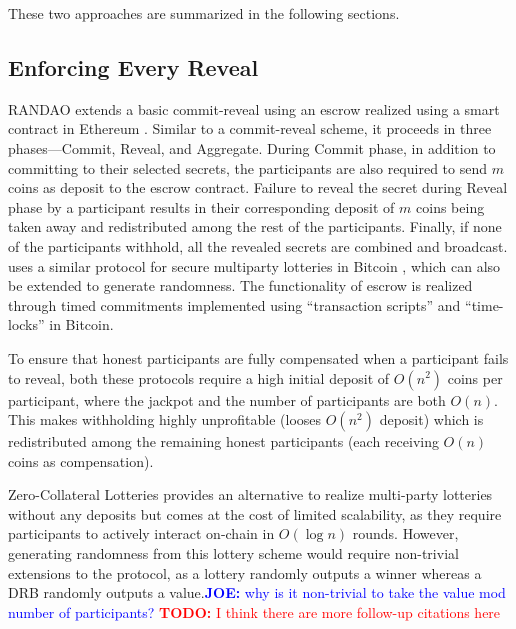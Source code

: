 \documentclass[letterpaper,twocolumn,10pt]{article}
\theoremstyle{definition}
\theoremstyle{remark}
\newcommand{\todo}[1]{\textcolor{red}{\textbf{TODO:} #1}}
\newcommand{\joenote}[1]{\textcolor{blue}{\textbf{JOE:} #1}}
\begin{document}
These two approaches are summarized in the following sections.


\subsection{Enforcing Every Reveal}
RANDAO \cite{youcai2017randao} extends a basic commit-reveal using an escrow realized using a smart contract in Ethereum \cite{wood2014ethereum}. Similar to a commit-reveal scheme, it proceeds in three phases---Commit, Reveal, and Aggregate. During Commit phase, in addition to committing to their selected secrets, the participants are also required to send $m$ coins as deposit to the escrow contract. Failure to reveal the secret during Reveal phase by a participant results in their corresponding deposit of $m$ coins being taken away and redistributed among the rest of the participants. Finally, if none of the participants withhold, all the revealed secrets are combined and broadcast. \cite{andrychowicz2014secure} uses a similar protocol for secure multiparty lotteries in Bitcoin \cite{nakamoto2019bitcoin}, which can also be extended to generate randomness. The functionality of escrow is realized through timed commitments implemented using ``transaction scripts'' and ``time-locks'' in Bitcoin. 

To ensure that honest participants are fully compensated when a participant fails to reveal, both these protocols require a high initial deposit of $O(n^2)$ coins per participant, where the jackpot and the number of participants are both $O(n)$. This makes withholding highly unprofitable (looses $O(n^2)$ deposit) which is redistributed among the remaining honest participants (each receiving $O(n)$ coins as compensation). 

Zero-Collateral Lotteries \cite{miller2017zero} provides an alternative to realize multi-party lotteries without any deposits but comes at the cost of limited scalability, as they require participants to actively interact on-chain in $O(\log n)$ rounds. However, generating randomness from this lottery scheme would require non-trivial extensions to the protocol, as a lottery randomly outputs a winner whereas a DRB randomly outputs a value.\joenote{why is it non-trivial to take the value mod number of participants?}
\todo{I think there are more follow-up citations here}
\end{document}
